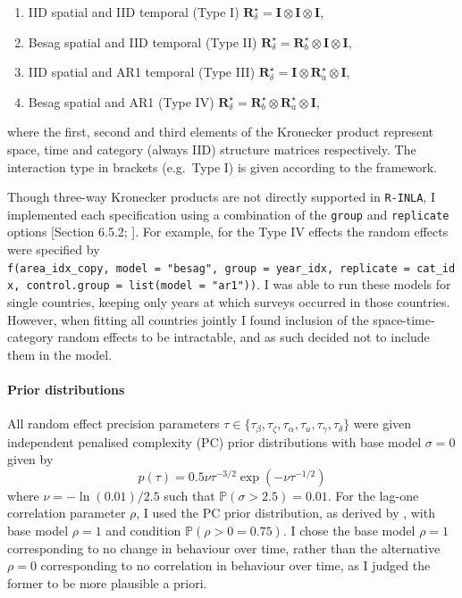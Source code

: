 \documentclass[a4paper, nobind]{templates/ociamthesis}
\providecommand{\tightlist}{%
  \setlength{\itemsep}{0pt}\setlength{\parskip}{0pt}}
\begin{document}
\begin{enumerate}
\def\labelenumi{\arabic{enumi}.}
\tightlist
\item
  IID spatial and IID temporal (Type I) \(\mathbf{R}^\star_\delta = \mathbf{I} \otimes \mathbf{I} \otimes \mathbf{I}\),
\item
  Besag spatial and IID temporal (Type II) \(\mathbf{R}^\star_\delta = \mathbf{R}^\star_b \otimes \mathbf{I} \otimes \mathbf{I}\),
\item
  IID spatial and AR1 temporal (Type III) \(\mathbf{R}^\star_\delta = \mathbf{I} \otimes \mathbf{R}^\star_a \otimes \mathbf{I}\),
\item
  Besag spatial and AR1 (Type IV) \(\mathbf{R}^\star_\delta = \mathbf{R}^\star_b \otimes \mathbf{R}^\star_a \otimes \mathbf{I}\),
\end{enumerate}

where the first, second and third elements of the Kronecker product represent space, time and category (always IID) structure matrices respectively.
The interaction type in brackets (e.g.~Type I) is given according to the \textcite{knorr2000bayesian} framework.

Though three-way Kronecker products are not directly supported in \texttt{R-INLA}, I implemented each specification using a combination of the \texttt{group} and \texttt{replicate} options {[}Section 6.5.2; \textcite{gomez2020bayesian}{]}.
For example, for the Type IV effects the random effects were specified by \texttt{f(area\_idx\_copy,\ model\ =\ "besag",\ group\ =\ year\_idx,\ replicate\ =\ cat\_idx,\ control.group\ =\ list(model\ =\ "ar1"))}.
I was able to run these models for single countries, keeping only years at which surveys occurred in those countries.
However, when fitting all countries jointly I found inclusion of the space-time-category random effects to be intractable, and as such decided not to include them in the model.

\hypertarget{prior-distributions}{%
\paragraph{Prior distributions}\label{prior-distributions}}

All random effect precision parameters \(\tau \in \{\tau_\beta, \tau_\zeta, \tau_\alpha, \tau_u, \tau_\gamma, \tau_\delta\}\) were given independent penalised complexity (PC) prior distributions \autocite{simpson2017penalising} with base model \(\sigma = 0\) given by
\begin{equation}
p(\tau) = 0.5 \nu \tau^{-3/2} \exp \left( - \nu \tau^{-1/2} \right)
\end{equation}
where \(\nu = - \ln(0.01) / 2.5\) such that \(\mathbb{P}(\sigma > 2.5) = 0.01\).
For the lag-one correlation parameter \(\rho\), I used the PC prior distribution, as derived by \textcite{sorbye2017penalised}, with base model \(\rho = 1\) and condition \(\mathbb{P}(\rho > 0 = 0.75)\).
I chose the base model \(\rho = 1\) corresponding to no change in behaviour over time, rather than the alternative \(\rho = 0\) corresponding to no correlation in behaviour over time, as I judged the former to be more plausible a priori.
\end{document}
